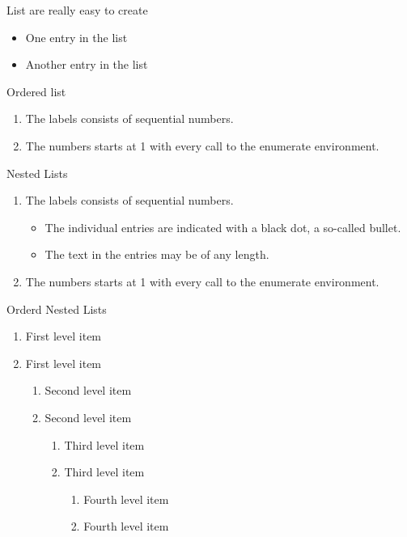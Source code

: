 \documentclass{article}
\begin{document}
List are really easy to create
 
\begin{itemize}
  \item One entry in the list
  \item Another entry in the list
\end{itemize}


Ordered list

\begin{enumerate}
  \item The labels consists of sequential numbers.
  \item The numbers starts at 1 with every call to the enumerate environment.
\end{enumerate}



Nested Lists 

\begin{enumerate}
   \item The labels consists of sequential numbers.
   \begin{itemize}
     \item The individual entries are indicated with a black dot, a so-called bullet.
     \item The text in the entries may be of any length.
   \end{itemize}
   \item The numbers starts at 1 with every call to the enumerate environment.
\end{enumerate}


Orderd Nested Lists 

\begin{enumerate}
  \item First level item
  \item First level item
  \begin{enumerate}
    \item Second level item
    \item Second level item
    \begin{enumerate}
      \item Third level item
      \item Third level item
      \begin{enumerate}
        \item Fourth level item
        \item Fourth level item
      \end{enumerate}
    \end{enumerate}
  \end{enumerate}
\end{enumerate}
\end{document}
